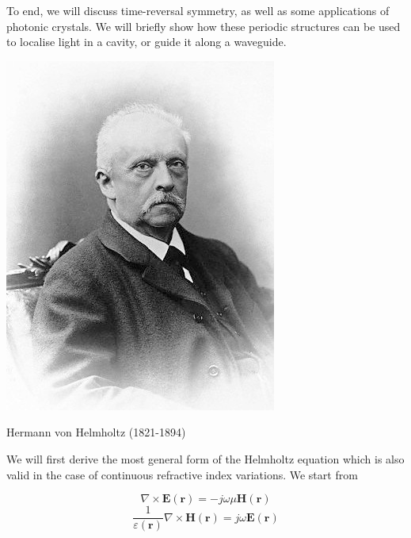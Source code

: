 To end, we will discuss time-reversal symmetry, as well as some applications of photonic crystals. We will briefly show how these periodic structures can be used to localise light in a cavity, or guide it along a waveguide.

\pagebreak




\begin{marginfigure}[-0.0cm]
  \includegraphics{helmholtz/figures/Hermann_von_Helmholtz}
  \caption{Hermann von Helmholtz (1821-1894)}
\end{marginfigure}

We will first derive the most general form of the Helmholtz equation which is also valid in the case of continuous refractive index variations. We start from

\begin{equation}
\nabla \times {\mathbf E({\mathbf r})} = - j \omega \mu {\mathbf H({\mathbf r})} \label{eq-maxwell-1}
\end{equation}
\begin{equation}   
\frac{1}{\varepsilon({\mathbf r})}\nabla \times {\mathbf H({\mathbf r})} = j \omega {\mathbf E({\mathbf r})} \label{eq-maxwell-2}
\end{equation}

